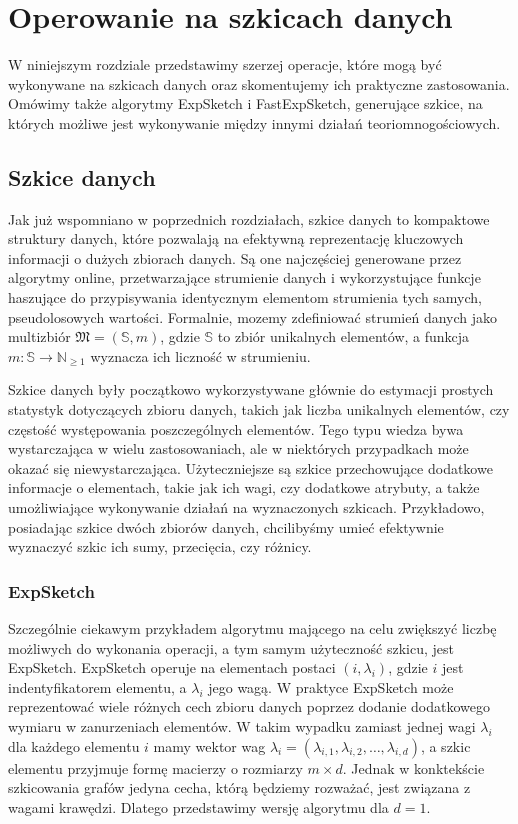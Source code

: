 \chapter{Operowanie na szkicach danych}
    W niniejszym rozdziale przedstawimy szerzej operacje, które mogą być wykonywane na szkicach danych oraz skomentujemy ich praktyczne zastosowania. Omówimy także algorytmy ExpSketch i FastExpSketch, generujące szkice, na których możliwe jest wykonywanie między innymi działań teoriomnogościowych.

\section{Szkice danych}
    Jak już wspomniano w poprzednich rozdziałach, szkice danych to kompaktowe struktury danych, które pozwalają na efektywną reprezentację kluczowych informacji o dużych zbiorach danych. Są one najczęściej generowane przez algorytmy online, przetwarzające strumienie danych i wykorzystujące funkcje haszujące do przypisywania identycznym elementom strumienia tych samych, pseudolosowych wartości. Formalnie, mozemy zdefiniować strumień danych jako multizbiór $\mathfrak{M} = (\mathbb{S},m)$, gdzie $\mathbb{S}$ to zbiór unikalnych elementów, a funkcja $m : \mathbb{S} \rightarrow \mathbb{N}_{\geq 1}$ wyznacza ich liczność w strumieniu.

    Szkice danych były początkowo wykorzystywane głównie do estymacji prostych statystyk dotyczących zbioru danych, takich jak liczba unikalnych elementów, czy częstość występowania poszczególnych elementów. Tego typu wiedza bywa wystarczająca w wielu zastosowaniach, ale w niektórych przypadkach może okazać się niewystarczająca. Użyteczniejsze są szkice przechowujące dodatkowe informacje o elementach, takie jak ich wagi, czy dodatkowe atrybuty, a także umożliwiające wykonywanie działań na wyznaczonych szkicach. Przykładowo, posiadając szkice dwóch zbiorów danych, chcilibyśmy umieć efektywnie wyznaczyć szkic ich sumy, przecięcia, czy różnicy.  

\subsection{ExpSketch}
    Szczególnie ciekawym przykładem algorytmu mającego na celu zwiększyć liczbę możliwych do wykonania operacji, a tym samym użyteczność szkicu, jest ExpSketch\cite{Lemiesz_2021}. ExpSketch operuje na elementach postaci $(i, \lambda_{i})$, gdzie $i$ jest indentyfikatorem elementu, a $\lambda_{i}$ jego wagą. W praktyce ExpSketch może reprezentować wiele różnych cech zbioru danych poprzez dodanie dodatkowego wymiaru w zanurzeniach elementów. W takim wypadku zamiast jednej wagi $\lambda_i$ dla każdego elementu $i$ mamy wektor wag $\lambda_i = (\lambda_{i,1}, \lambda_{i,2}, \dots, \lambda_{i,d})$, a szkic elementu przyjmuje formę macierzy o rozmiarzy $m \times d$. Jednak w konktekście szkicowania grafów jedyna cecha, którą będziemy rozważać, jest związana z wagami krawędzi. Dlatego przedstawimy wersję algorytmu dla $d = 1$.

